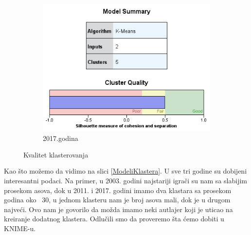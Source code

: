 \documentclass[a4paper]{article}
\begin{document}
\begin{figure}[H]
	\vspace{1cm}
	\begin{subfigure}[h]{\textwidth}
		\begin{center}
			\includegraphics[scale=0.50]{Klasterovanje/Model_KMeans2017_Silhouette.png}
		\end{center}
		\caption{2017.godina}
		\label{fig:SPSS_Silueta2017}
	\end{subfigure}

	\caption{Kvalitet klasterovanja}
	\label{Siluete}
\end{figure}

Kao što možemo da vidimo na slici \ref{ModeliKlastera}. U sve tri godine su dobijeni interesantni podaci. Na primer, u 2003. godini najstariji igrači su nam sa slabijim prosekom asova, dok u 2011. i 2017. godini imamo dva klastara sa prosekom godina oko ~30, u jednom klasteru nam je broj asova mali, dok je u drugom najveći. Ovo nam je govorilo da možda imamo neki autlajer koji je uticao na kreiranje dodatnog klastera. Odlučili smo da proveremo šta ćemo dobiti u KNIME-u.
 
\end{document}
